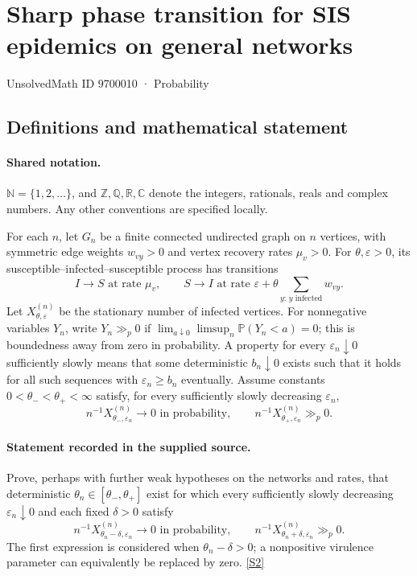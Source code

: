 \documentclass[11pt]{article}
\newcommand{\sref}[2]{\hyperlink{source:#1:#2}{[S#2]}}
\begin{document}
\setcounter{section}{9700009}
\section{Sharp phase transition for SIS epidemics on general networks}\label{9700010}
{\small\sffamily UnsolvedMath ID 9700010 · Probability}
\subsection{Definitions and mathematical statement}

\paragraph{Shared notation.}$\mathbb N=\{1,2,\ldots\}$, and $\mathbb Z,\mathbb Q,\mathbb R,\mathbb C$ denote the integers, rationals, reals and complex numbers. Any other conventions are specified locally.


For each $n$, let $G_n$ be a finite connected undirected graph on $n$ vertices, with symmetric edge weights $w_{vy}>0$ and vertex recovery rates $\mu_v>0$. For $\theta,\varepsilon>0$, its susceptible--infected--susceptible process has transitions
\[I\to S\text{ at rate }\mu_v,\qquad S\to I\text{ at rate }\varepsilon+\theta\sum_{y:\,y\text{ infected}}w_{vy}.\]
Let $X^{(n)}_{\theta,\varepsilon}$ be the stationary number of infected vertices. For nonnegative variables $Y_n$, write $Y_n\gg_p0$ if $\lim_{a\downarrow0}\limsup_n\mathbb P(Y_n<a)=0$; this is boundedness away from zero in probability. A property for every $\varepsilon_n\downarrow0$ sufficiently slowly means that some deterministic $b_n\downarrow0$ exists such that it holds for all such sequences with $\varepsilon_n\ge b_n$ eventually.
Assume constants $0<\theta_-<\theta_+<\infty$ satisfy, for every sufficiently slowly decreasing $\varepsilon_n$,
\[n^{-1}X^{(n)}_{\theta_-,\varepsilon_n}\to0\text{ in probability},\qquad n^{-1}X^{(n)}_{\theta_+,\varepsilon_n}\gg_p0.\]
\paragraph{Statement recorded in the supplied source.}
Prove, perhaps with further weak hypotheses on the networks and rates, that deterministic $\theta_n\in[\theta_-,\theta_+]$ exist for which every sufficiently slowly decreasing $\varepsilon_n\downarrow0$ and each fixed $\delta>0$ satisfy
\[n^{-1}X^{(n)}_{\theta_n-\delta,\varepsilon_n}\to0\text{ in probability},\qquad n^{-1}X^{(n)}_{\theta_n+\delta,\varepsilon_n}\gg_p0.\]
The first expression is considered when $\theta_n-\delta>0$; a nonpositive virulence parameter can equivalently be replaced by zero. \sref{9700010}{2}
\end{document}
